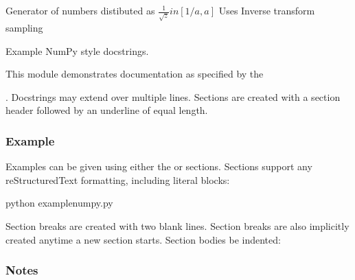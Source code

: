 \documentclass[letterpaper,10pt,english]{sphinxmanual}
\begin{document}
\begin{description}

\begin{fulllineitems}
\label{\detokenize{autogen:AIE_sampling.get_stretch}}
Generator of numbers distibuted as \(\frac{1}{\sqrt{z}} in [1/a,a]\)
Uses Inverse transform sampling

\end{fulllineitems}

\label{\detokenize{autogen:module-example_docstring}}
Example NumPy style docstrings.

This module demonstrates documentation as specified by the %
\begin{footnote}[1]\sphinxAtStartFootnote
{}
%
\end{footnote}. Docstrings may extend over multiple lines. Sections
are created with a section header followed by an underline of equal length.
\subsubsection*{Example}

Examples can be given using either the  or 
sections. Sections support any reStructuredText formatting, including
literal blocks:

\begin{sphinxVerbatim}[commandchars=\\\{\}]
\PYGZdl{} python example\PYGZus{}numpy.py
\end{sphinxVerbatim}

Section breaks are created with two blank lines. Section breaks are also
implicitly created anytime a new section starts. Section bodies  be
indented:
\subsubsection*{Notes}


\end{description}
\end{document}
